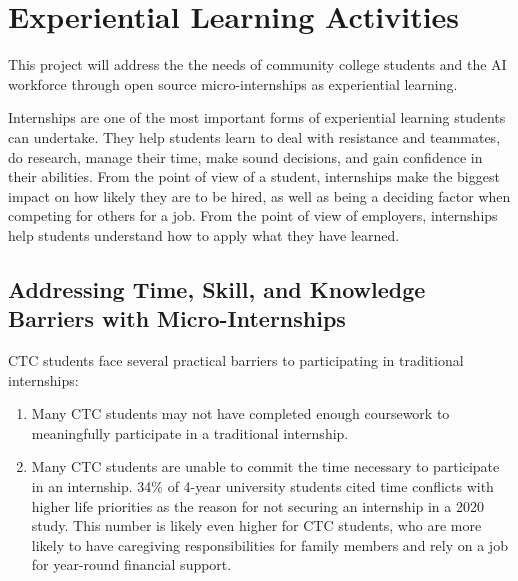 \section{Experiential Learning Activities}

This project will address the the needs of community college students and the AI workforce through open source micro-internships as experiential learning.

Internships are one of the most important forms of experiential learning students can undertake. They help students learn to deal with resistance and teammates, do research, manage their time, make sound decisions, and gain confidence in their abilities.\cite{beaubouefComputerScienceCurriculum2011} From the point of view of a student, internships make the biggest impact on how likely they are to be hired,\cite{callananAssessingRoleInternships2004,jonesTransformingCurriculumPreparing2002,knouseRelationCollegeInternships1999,saltikoffPositiveImplicationsInternships2017,stepanovaHiringCSGraduates2021} as well as being a deciding factor when competing for others for a job.\cite{grayInternshipExperienceMost} From the point of view of employers, internships help students understand how to apply what they have learned.\cite{beaubouefComputerScienceCurriculum2011}

\subsection{Addressing Time, Skill, and Knowledge Barriers with Micro-Internships}

CTC students face several practical barriers to participating in traditional internships:

\begin{enumerate}
    \item Many CTC students may not have completed enough coursework to meaningfully participate in a traditional internship.
    \item Many CTC students are unable to commit the time necessary to participate in an internship. 34\% of 4-year university students cited time conflicts with higher life priorities as the reason for not securing an internship in a 2020 study.\cite{kapoorBarriersSecuringIndustry2020} This number is likely even higher for CTC students, who are more likely to have caregiving responsibilities for family members and rely on a job for year-round financial support.\cite{AlmanacAmericanEducation,phillippeNationalProfileCommunity2005}
\end{enumerate}

